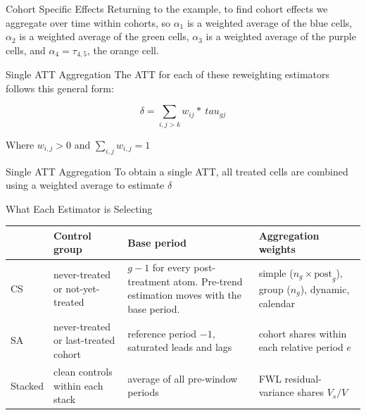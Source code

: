 \documentclass[11pt]{beamer}
\begin{document}
\begin{frame}{Cohort Specific Effects}
    Returning to the example, to find cohort effects we aggregate over time within cohorts, so $\alpha_1$ is a weighted average of the blue cells, $\alpha_2$ is a weighted average of the green cells, $\alpha_3$ is a weighted average of the purple cells, and $\alpha_4 = \tau_{4,5}$, the orange cell.
    
\end{frame}

\begin{frame}{Single ATT Aggregation}
    The ATT for each of these reweighting estimators follows this general form:

    \begin{equation}\label{eq:delta}
        \delta = \sum_{i,j>k} w_{ij} * \ tau_{gj}
    \end{equation}

    Where $w_{i,j} > 0$ and $\sum_{i,j} w_{i,j} = 1$
\end{frame}

\begin{frame}{Single ATT Aggregation}
    To obtain a single ATT, all treated cells are combined using a weighted average to estimate $\delta$

    
\end{frame}

\begin{frame}{What Each Estimator is Selecting}
        \begin{center}
    \footnotesize
    \begin{tabular}{@{}l p{2cm} p{2cm} p{2cm}@{}}
        \toprule
          & \textbf{Control group} & \textbf{Base period}
          & \textbf{Aggregation weights} \\
        \midrule
 
        CS
          & never-treated or not-yet-treated
          & $g-1$ for every post-treatment atom. Pre-trend estimation moves with the base period.
          & simple ($n_g \times \mathrm{post}_g$),
            group ($n_g$), dynamic, calendar \\
        \addlinespace
 
        SA
          & never-treated or last-treated cohort
          & reference period $-1$, saturated leads and lags
          & cohort shares within each relative period $e$ \\
        \addlinespace
 
        Stacked
          & clean controls within each stack
          & average of all pre-window periods
          & FWL residual-variance shares $V_s / V$ \\
 
        \bottomrule
    \end{tabular}
    \end{center}
\end{frame}
\end{document}
